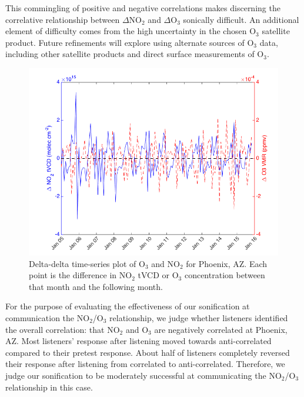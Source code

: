 \documentclass[a4paper,10pt,oneside]{article}
\newcommand{\ce}[1]{$\mathrm{#1}$}
\begin{document}
\begin{sloppy}
	This commingling of positive and negative correlations makes discerning the correlative relationship between $\Delta$\ce{NO_2} and $\Delta$\ce{O_3} sonically difficult. An additional element of difficulty comes from the high uncertainty in the chosen \ce{O_3} satellite product. Future refinements will explore using alternate sources of \ce{O_3} data, including other satellite products and direct surface measurements of \ce{O_3}.
	
	\begin{figure}
	\centering
	\includegraphics[width=0.95\columnwidth]{figs/delta-delta-timeser-phoenix_AZ.png} 
	\caption{Delta-delta time-series plot of \ce{O_3} and \ce{NO_2} for Phoenix, AZ. Each point is the difference in \ce{NO_2} tVCD or \ce{O_3} concentration between that month and the following month.}
	\label{fig:del-del}
	\end{figure}
	
	For the purpose of evaluating the effectiveness of our sonification at communication the \ce{NO_2}/\ce{O_3} relationship, we judge whether listeners identified the overall correlation: that \ce{NO_2} and \ce{O_3} are negatively correlated at Phoenix, AZ. Most listeners' response after listening moved towards anti-correlated compared to their pretest response. About half of listeners completely reversed their response after listening from correlated to anti-correlated. Therefore, we judge our sonification to be moderately successful at communicating the \ce{NO_2}/\ce{O_3} relationship in this case.


\end{sloppy}
\end{document}
